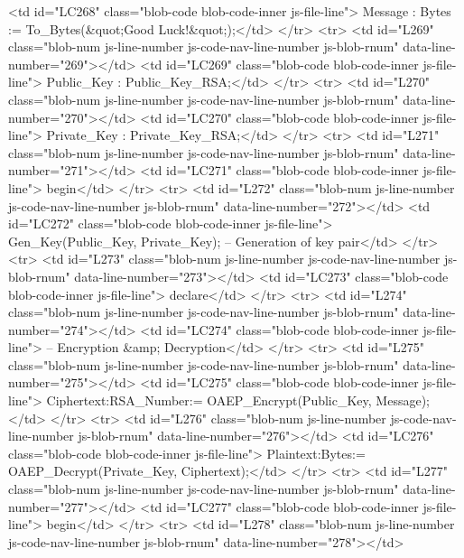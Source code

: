           <td id="LC268" class="blob-code blob-code-inner js-file-line">    Message : Bytes := To_Bytes(&quot;Good Luck!&quot;);</td>
        </tr>
        <tr>
          <td id="L269" class="blob-num js-line-number js-code-nav-line-number js-blob-rnum" data-line-number="269"></td>
          <td id="LC269" class="blob-code blob-code-inner js-file-line">    Public_Key : Public_Key_RSA;</td>
        </tr>
        <tr>
          <td id="L270" class="blob-num js-line-number js-code-nav-line-number js-blob-rnum" data-line-number="270"></td>
          <td id="LC270" class="blob-code blob-code-inner js-file-line">    Private_Key : Private_Key_RSA;</td>
        </tr>
        <tr>
          <td id="L271" class="blob-num js-line-number js-code-nav-line-number js-blob-rnum" data-line-number="271"></td>
          <td id="LC271" class="blob-code blob-code-inner js-file-line">  begin</td>
        </tr>
        <tr>
          <td id="L272" class="blob-num js-line-number js-code-nav-line-number js-blob-rnum" data-line-number="272"></td>
          <td id="LC272" class="blob-code blob-code-inner js-file-line">    Gen_Key(Public_Key, Private_Key); -- Generation of key pair</td>
        </tr>
        <tr>
          <td id="L273" class="blob-num js-line-number js-code-nav-line-number js-blob-rnum" data-line-number="273"></td>
          <td id="LC273" class="blob-code blob-code-inner js-file-line">    declare</td>
        </tr>
        <tr>
          <td id="L274" class="blob-num js-line-number js-code-nav-line-number js-blob-rnum" data-line-number="274"></td>
          <td id="LC274" class="blob-code blob-code-inner js-file-line">      -- Encryption &amp; Decryption</td>
        </tr>
        <tr>
          <td id="L275" class="blob-num js-line-number js-code-nav-line-number js-blob-rnum" data-line-number="275"></td>
          <td id="LC275" class="blob-code blob-code-inner js-file-line">	  Ciphertext:RSA_Number:= OAEP_Encrypt(Public_Key, Message);</td>
        </tr>
        <tr>
          <td id="L276" class="blob-num js-line-number js-code-nav-line-number js-blob-rnum" data-line-number="276"></td>
          <td id="LC276" class="blob-code blob-code-inner js-file-line">	  Plaintext:Bytes:= OAEP_Decrypt(Private_Key, Ciphertext);</td>
        </tr>
        <tr>
          <td id="L277" class="blob-num js-line-number js-code-nav-line-number js-blob-rnum" data-line-number="277"></td>
          <td id="LC277" class="blob-code blob-code-inner js-file-line">    begin</td>
        </tr>
        <tr>
          <td id="L278" class="blob-num js-line-number js-code-nav-line-number js-blob-rnum" data-line-number="278"></td>
